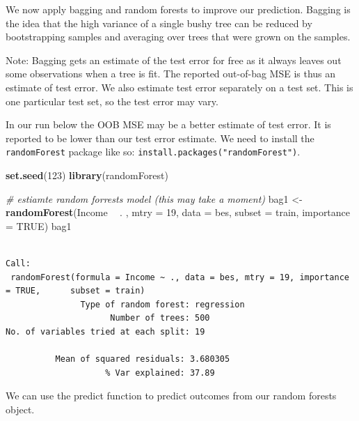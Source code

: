 \documentclass[]{article}
\newenvironment{Shaded}{\begin{snugshade}}{\end{snugshade}}
\newcommand{\CommentTok}[1]{\textcolor[rgb]{0.56,0.35,0.01}{\textit{#1}}}
\newcommand{\DataTypeTok}[1]{\textcolor[rgb]{0.13,0.29,0.53}{#1}}
\newcommand{\DecValTok}[1]{\textcolor[rgb]{0.00,0.00,0.81}{#1}}
\newcommand{\KeywordTok}[1]{\textcolor[rgb]{0.13,0.29,0.53}{\textbf{#1}}}
\newcommand{\NormalTok}[1]{#1}
\newcommand{\OperatorTok}[1]{\textcolor[rgb]{0.81,0.36,0.00}{\textbf{#1}}}
\newcommand{\OtherTok}[1]{\textcolor[rgb]{0.56,0.35,0.01}{#1}}
\newcommand{\StringTok}[1]{\textcolor[rgb]{0.31,0.60,0.02}{#1}}
\begin{document}
We now apply bagging and random forests to improve our prediction. Bagging is the idea that the high variance of a single bushy tree can be reduced by bootstrapping samples and averaging over trees that were grown on the samples.

Note: Bagging gets an estimate of the test error for free as it always leaves out some observations when a tree is fit. The reported out-of-bag MSE is thus an estimate of test error. We also estimate test error separately on a test set. This is one particular test set, so the test error may vary.

In our run below the OOB MSE may be a better estimate of test error. It is reported to be lower than our test error estimate. We need to install the \texttt{randomForest} package like so: \texttt{install.packages("randomForest")}.

\begin{Shaded}
\begin{Highlighting}[]
\KeywordTok{set.seed}\NormalTok{(}\DecValTok{123}\NormalTok{)}
\KeywordTok{library}\NormalTok{(randomForest)}

\CommentTok{# estiamte random forrests model (this may take a moment)}
\NormalTok{bag1 <-}\StringTok{ }\KeywordTok{randomForest}\NormalTok{(Income }\OperatorTok{~}\StringTok{ }\NormalTok{. , }\DataTypeTok{mtry =} \DecValTok{19}\NormalTok{, }\DataTypeTok{data =}\NormalTok{ bes, }\DataTypeTok{subset =}\NormalTok{ train, }\DataTypeTok{importance =} \OtherTok{TRUE}\NormalTok{)}
\NormalTok{bag1}
\end{Highlighting}
\end{Shaded}

\begin{verbatim}

Call:
 randomForest(formula = Income ~ ., data = bes, mtry = 19, importance = TRUE,      subset = train) 
               Type of random forest: regression
                     Number of trees: 500
No. of variables tried at each split: 19

          Mean of squared residuals: 3.680305
                    % Var explained: 37.89
\end{verbatim}

We can use the predict function to predict outcomes from our random forests object.

\begin{Shaded}
\end{Shaded}
\end{document}

